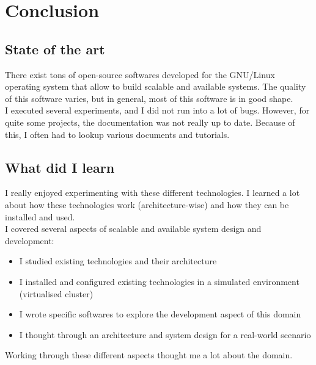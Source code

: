 \documentclass[12pt]{report}
\begin{document}
\chapter{Conclusion} %
\section{State of the art}
There exist tons of open-source softwares developed for the GNU/Linux 
operating system that allow to build scalable and available systems.
The quality of this software varies, but in general, most of this
software is in good shape. \\
I executed several experiments, and I did not run into a lot of
bugs. However, for quite some projects, the documentation was not
really up to date. Because of this, I often had to lookup various
documents and tutorials.\\

\section{What did I learn}
I really enjoyed experimenting with these different technologies. I
learned a lot about how these technologies work (architecture-wise) and how
they can be installed and used.\\
I covered several aspects of scalable and available system design and
development: 
\begin{itemize}
\item I studied existing technologies and their architecture
\item I installed and configured existing technologies in a simulated
  environment (virtualised cluster)
\item I wrote specific softwares to explore the development aspect of
  this domain
\item I thought through an architecture and system design for a
  real-world scenario
\end{itemize}
Working through these different aspects thought me a lot about the
domain. 
\end{document}
